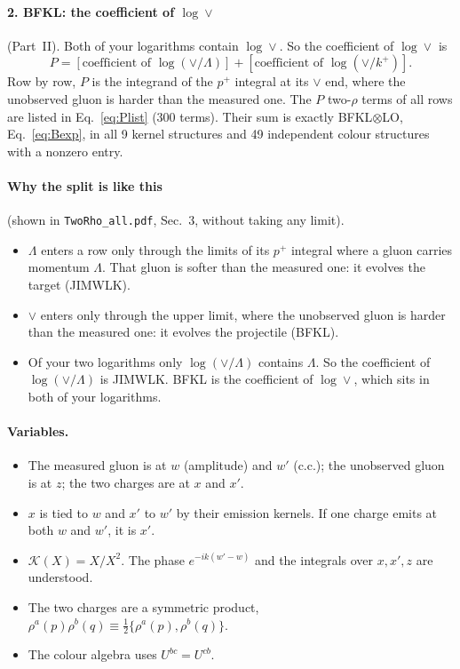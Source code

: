 \documentclass[10pt]{article}
\numberwithin{equation}{section}
\newcommand{\KK}{\mathcal K}
\begin{document}
\paragraph{2. BFKL: the coefficient of $\log\vee$} (Part~II). Both of your logarithms contain $\log\vee$. So the coefficient of $\log\vee$ is
\begin{equation*}
P=[\text{coefficient of }\log(\vee/\Lambda)]+[\text{coefficient of }\log(\vee/k^+)].
\end{equation*}
Row by row, $P$ is the integrand of the $p^+$ integral at its $\vee$ end, where the unobserved gluon is harder than the measured one. The $P$ two-$\rho$ terms of all rows are listed in Eq.~\eqref{eq:Plist} (300 terms). Their sum is exactly BFKL$\otimes$LO, Eq.~\eqref{eq:Bexp}, in all 9 kernel structures and 49 independent colour structures with a nonzero entry.

\paragraph{Why the split is like this} (shown in \texttt{TwoRho\_all.pdf}, Sec.~3, without taking any limit).
\begin{itemize}
\item $\Lambda$ enters a row only through the limits of its $p^+$ integral where a gluon carries momentum $\Lambda$. That gluon is softer than the measured one: it evolves the target (JIMWLK).
\item $\vee$ enters only through the upper limit, where the unobserved gluon is harder than the measured one: it evolves the projectile (BFKL).
\item Of your two logarithms only $\log(\vee/\Lambda)$ contains $\Lambda$. So the coefficient of $\log(\vee/\Lambda)$ is JIMWLK. BFKL is the coefficient of $\log\vee$, which sits in both of your logarithms.
\end{itemize}

\paragraph{Variables.}
\begin{itemize}
\item The measured gluon is at $w$ (amplitude) and $w'$ (c.c.); the unobserved gluon is at $z$; the two charges are at $x$ and $x'$.
\item $x$ is tied to $w$ and $x'$ to $w'$ by their emission kernels. If one charge emits at both $w$ and $w'$, it is $x'$.
\item $\KK(X)=X/X^2$. The phase $e^{-ik(w'-w)}$ and the integrals over $x,x',z$ are understood.
\item The two charges are a symmetric product, $\rho^a(p)\rho^b(q)\equiv\frac12\{\rho^a(p),\rho^b(q)\}$.
\item The colour algebra uses $U^{bc}=U^{cb}$.
\end{itemize}
\end{document}
